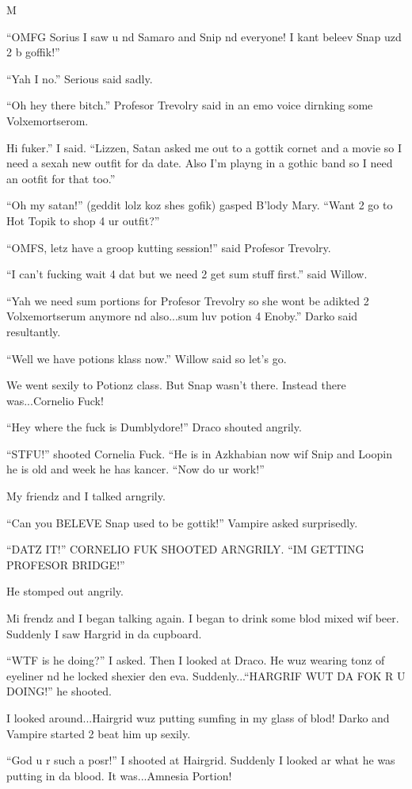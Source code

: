 M\documentclass{article}
\begin{document}
“OMFG Sorius I saw u nd Samaro and Snip nd everyone! I kant beleev Snap uzd 2 b goffik!”

“Yah I no.” Serious said sadly.

“Oh hey there bitch.” Profesor Trevolry said in an emo voice dirnking some Volxemortserom.

Hi fuker.” I said. “Lizzen, Satan asked me out to a gottik cornet and a movie so I need a sexah new outfit for da date. Also I’m playng in a gothic band so I need an ootfit for that too.”

“Oh my satan!” (geddit lolz koz shes gofik) gasped B’lody Mary. “Want 2 go to Hot Topik to shop 4 ur outfit?”

“OMFS, letz have a groop kutting session!” said Profesor Trevolry.

“I can’t fucking wait 4 dat but we need 2 get sum stuff first.” said Willow.

“Yah we need sum portions for Profesor Trevolry so she wont be adikted 2 Volxemortserum anymore nd also...sum luv potion 4 Enoby.” Darko said resultantly.

“Well we have potions klass now.” Willow said so let’s go.

We went sexily to Potionz class. But Snap wasn’t there. Instead there was...Cornelio Fuck!

“Hey where the fuck is Dumblydore!” Draco shouted angrily.

“STFU!” shooted Cornelia Fuck. “He is in Azkhabian now wif Snip and Loopin he is old and week he has kancer. “Now do ur work!”

My friendz and I talked arngrily.

“Can you BELEVE Snap used to be gottik!” Vampire asked surprisedly.

“DATZ IT!” CORNELIO FUK SHOOTED ARNGRILY. “IM GETTING PROFESOR BRIDGE!”

He stomped out angrily.

Mi frendz and I began talking again. I began to drink some blod mixed wif beer. Suddenly I saw Hargrid in da cupboard.

“WTF is he doing?” I asked. Then I looked at Draco. He wuz wearing tonz of eyeliner nd he locked shexier den eva. Suddenly...“HARGRIF WUT DA FOK R U DOING!” he shooted.

I looked around...Hairgrid wuz putting sumfing in my glass of blod! Darko and Vampire started 2 beat him up sexily.

“God u r such a posr!” I shooted at Hairgrid. Suddenly I looked ar what he was putting in da blood. It was...Amnesia Portion!
\end{document}
